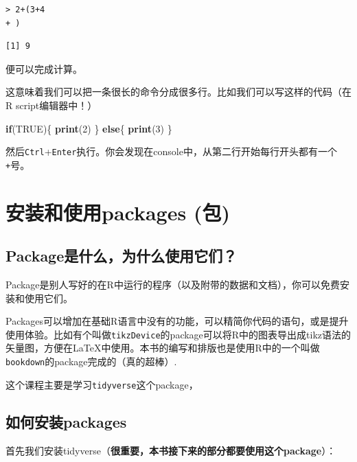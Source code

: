 \documentclass[]{book}
\newenvironment{Shaded}{\begin{snugshade}}{\end{snugshade}}
\newcommand{\ControlFlowTok}[1]{\textcolor[rgb]{0.13,0.29,0.53}{\textbf{#1}}}
\newcommand{\DecValTok}[1]{\textcolor[rgb]{0.00,0.00,0.81}{#1}}
\newcommand{\KeywordTok}[1]{\textcolor[rgb]{0.13,0.29,0.53}{\textbf{#1}}}
\newcommand{\NormalTok}[1]{#1}
\newcommand{\OtherTok}[1]{\textcolor[rgb]{0.56,0.35,0.01}{#1}}
\begin{document}
\begin{verbatim}
> 2+(3+4
+ )
\end{verbatim}

\begin{verbatim}
[1] 9
\end{verbatim}

便可以完成计算。

这意味着我们可以把一条很长的命令分成很多行。比如我们可以写这样的代码（在R script编辑器中！）

\begin{Shaded}
\begin{Highlighting}[]
\ControlFlowTok{if}\NormalTok{(}\OtherTok{TRUE}\NormalTok{)\{}
  \KeywordTok{print}\NormalTok{(}\DecValTok{2}\NormalTok{)}
\NormalTok{\} }\ControlFlowTok{else}\NormalTok{\{}
  \KeywordTok{print}\NormalTok{(}\DecValTok{3}\NormalTok{)}
\NormalTok{\}}
\end{Highlighting}
\end{Shaded}

然后\texttt{Ctrl}+\texttt{Enter}执行。你会发现在console中，从第二行开始每行开头都有一个\texttt{+}号。

\hypertarget{packages}{%
\chapter{安装和使用packages (包)}\label{packages}}

\hypertarget{package}{%
\section{Package是什么，为什么使用它们？}\label{package}}

Package是别人写好的在R中运行的程序（以及附带的数据和文档），你可以免费安装和使用它们。

Packages可以增加在基础R语言中没有的功能，可以精简你代码的语句，或是提升使用体验。比如有个叫做\texttt{tikzDevice}的package可以将R中的图表导出成tikz语法的矢量图，方便在LaTeX中使用。本书的编写和排版也是使用R中的一个叫做\texttt{bookdown}的package完成的（真的超棒）.

这个课程主要是学习\texttt{tidyverse}这个package，

\hypertarget{packages}{%
\section{如何安装packages}\label{packages}}

首先我们安装tidyverse（\textbf{很重要，本书接下来的部分都要使用这个package}）：
\end{document}
